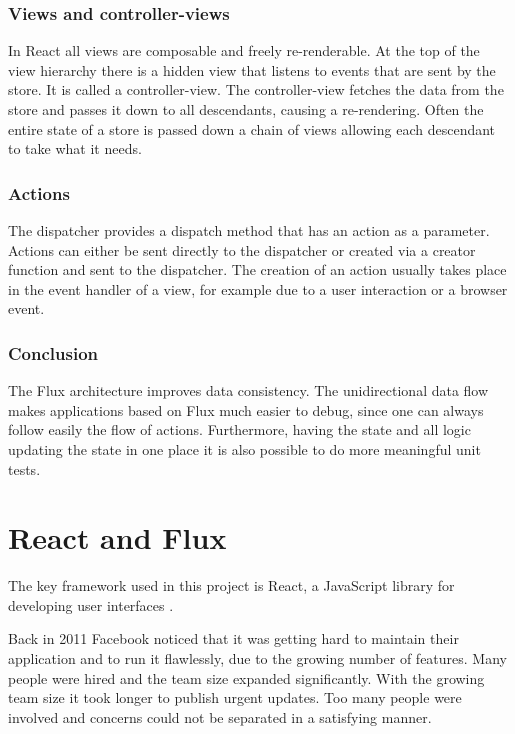 \subsubsection{Views and controller-views}

In React all views are composable and freely re-renderable. 
At the top of the view hierarchy there is a hidden view that listens to events that are sent by the store.
It is called a controller-view. 
The controller-view fetches the data from the store and passes it down to all descendants,
causing a re-rendering. Often the entire state of a store is passed down a chain of views allowing each descendant to take what it needs.

\subsubsection{Actions}

The dispatcher provides a dispatch method that has an action as a parameter. Actions can either be sent directly to the dispatcher or created via a creator function and sent to the dispatcher. The creation of an action usually takes place in the event handler of a view, for example due to a user interaction or a browser event.


\subsubsection{Conclusion}
The Flux architecture improves data consistency. 
The unidirectional data flow makes  applications based on Flux much easier to debug, 
since one can always follow easily the flow of actions. 
Furthermore, having the state and all logic updating the state in one place
it is also possible to do more meaningful unit tests.

\section{React and Flux}

The key framework used in this project is React, a  JavaScript library for developing user interfaces \cite{React}.

Back in 2011 Facebook noticed that it was getting hard to maintain
their application and to run it flawlessly, due to the  growing number of features.
Many people were hired and the team size expanded significantly.
With the growing team size it took longer to publish urgent updates.
Too many people were involved and concerns could not be separated in a satisfying manner.

